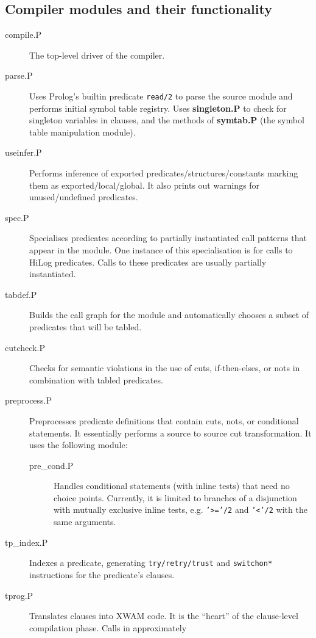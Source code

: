\subsection{Compiler modules and their functionality}
\begin{description}
\item[compile.P] The top-level driver of the compiler.
\item[parse.P]	Uses Prolog's builtin predicate {\tt read/2} to parse
		the source module and performs initial symbol table registry.
		Uses {\bf singleton.P} to check for singleton variables in
		clauses, and the methods of {\bf symtab.P} (the symbol table
		manipulation module).
\item[useinfer.P]
		Performs inference of exported predicates/structures/constants
		marking them as exported/local/global.  It also prints out
		warnings for unused/undefined predicates.
\item[spec.P]	Specialises predicates according to partially instantiated
		call patterns that appear in the module.  One instance of this
		specialisation is for calls to HiLog predicates.  Calls to
		these predicates are usually partially instantiated.
\item[tabdef.P] Builds the call graph for the module and automatically chooses
		a subset of predicates that will be tabled.
\item[cutcheck.P]
		Checks for semantic violations in the use of cuts,
		if-then-elses, or nots in combination with tabled predicates.
\item[preprocess.P]
		Preprocesses predicate definitions that contain cuts, nots,
		or conditional statements.  It essentially performs
		a source to source cut transformation.  It uses the
		following module:
	\begin{description}
	\item[pre\_cond.P] Handles conditional statements (with inline tests)
		that need no choice points.  Currently, it is limited to
		branches of a disjunction with mutually exclusive inline
		tests, e.g. {\tt '>='/2} and {\tt '<'/2} with the same
		arguments.
	\end{description}
\item[tp\_index.P] Indexes a predicate, generating {\tt try/retry/trust}
		and {\tt switchon*} instructions for the predicate's clauses.
\item[tprog.P]	Translates clauses into XWAM code.  It is the ``heart''
		of the clause-level compilation phase. Calls in approximately

\end{description}
